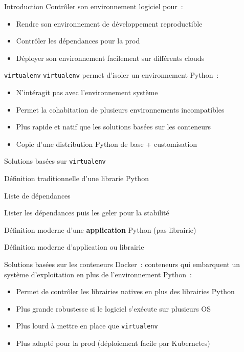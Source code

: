 \begin{frame}{Introduction}
  Contrôler son environnement logiciel pour~:
  \begin{itemize}[<+->]
    \item Rendre son environnement de développement reproductible
    \item Contrôler les dépendances pour la prod
    \item Déployer son environnement facilement sur différents clouds
  \end{itemize}
\end{frame}

\begin{frame}{\texttt{virtualenv}}
  \texttt{virtualenv} permet d'isoler un environnement Python~:
  \begin{itemize}[<+->]
    \item N'intéragit pas avec l'environnement système
    \item Permet la cohabitation de plusieurs environnements incompatibles
    \item Plus rapide et natif que les solutions basées sur les conteneurs
    \item Copie d'une distribution Python de base + customisation
  \end{itemize}
\end{frame}

\begin{frame}{Solutions basées sur \texttt{virtualenv}}
  \begin{description}[<+->]
    \item[pip + setup.py] Définition traditionnelle d'une librarie Python
    \item[pip + requirements.txt] Liste de dépendances
    \item[pip + pip-compile] Lister les dépendances puis les geler pour la stabilité
    \item[Pipenv] Définition moderne d'une \textbf{application} Python (pas librairie)
    \item[poetry] Définition moderne d'application ou librairie
  \end{description}
\end{frame}

\begin{frame}{Solutions basées sur les conteneurs}
  Docker~: conteneurs qui embarquent un système d'exploitation en plus de l'environnement Python~:
  \begin{itemize}[<+->]
    \item Permet de contrôler les librairies natives en plus des librairies Python
    \item Plus grande robustesse si le logiciel s'exécute sur plusieurs OS
    \item Plus lourd à mettre en place que \texttt{virtualenv}
    \item Plus adapté pour la prod (déploiement facile par Kubernetes)
  \end{itemize}
\end{frame}
